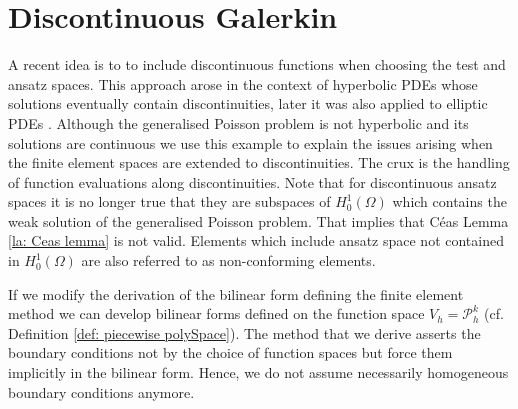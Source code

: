 \section{Discontinuous Galerkin} \label{sec: SIPG}
A recent idea is to to include discontinuous functions when choosing the test and ansatz spaces. This approach arose in the context of hyperbolic PDEs whose solutions eventually contain discontinuities, later it was also applied to elliptic PDEs \cite{ABC+2002}. Although the generalised Poisson problem is not hyperbolic and its solutions are continuous we use this example to explain the issues arising when the finite element spaces are extended to discontinuities. The crux is the handling of function evaluations along discontinuities. Note that for discontinuous ansatz spaces it is no longer true that they are subspaces of $H_0^1(\Omega)$ which contains the weak solution of the generalised Poisson problem. That implies that C\'eas Lemma \ref{la: Ceas lemma} is not valid. Elements which include ansatz space not contained in $H_0^1(\Omega)$ are also referred to as non-conforming elements.

If we modify the derivation of the bilinear form defining the finite element method we can develop bilinear forms defined on the function space $V_h = \mathcal P_h^k$ (cf. Definition \ref{def: piecewise polySpace}). The method that we derive asserts the boundary conditions not by the choice of function spaces but force them implicitly in the bilinear form. Hence, we do not assume necessarily homogeneous boundary conditions anymore.

